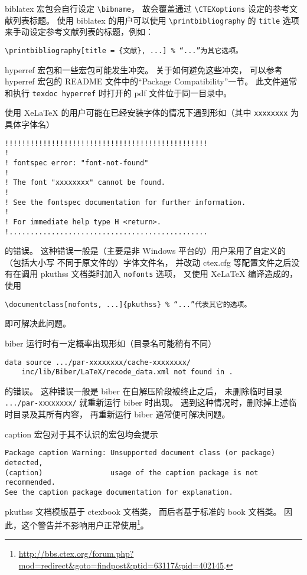 		biblatex 宏包\supercite{biblatex}会自行设定 \verb|\bibname|，
		故会覆盖通过 \verb|\CTEXoptions| 设定的参考文献列表标题。
		使用 biblatex 的用户可以使用 \verb|\printbibliography| 的
		\verb|title| 选项来手动设定参考文献列表的标题，例如：
\begin{Verbatim}[frame = single]
\printbibliography[title = {文献}, ...] % “...”为其它选项。
\end{Verbatim}

		hyperref 宏包\supercite{hyperref}和一些宏包可能发生冲突。
		关于如何避免这些冲突，
		可以参考 hyperref 宏包的 README 文件中的“Package Compatibility”一节。
		此文件通常和执行 \verb|texdoc hyperref| %
		时打开的 pdf 文件位于同一目录中。

		使用 Xe\LaTeX{} 的用户可能在已经安装字体的情况下遇到形如（其中
		\verb|xxxxxxxx| 为具体字体名）
\begin{Verbatim}[frame = single, fontsize = {\small}]
!!!!!!!!!!!!!!!!!!!!!!!!!!!!!!!!!!!!!!!!!!!!!!!!
!
! fontspec error: "font-not-found"
!
! The font "xxxxxxxx" cannot be found.
!
! See the fontspec documentation for further information.
!
! For immediate help type H <return>.
!...............................................
\end{Verbatim}
		的错误。
		这种错误一般是（主要是非 Windows 平台的）用户采用了自定义的（包括大小写
		不同于原文件的）字体文件名，
		并改动 ctex.cfg 等配置文件之后没有在调用 pkuthss 文档类时加入
		\verb|nofonts| 选项，
		又使用 Xe\LaTeX{} 编译造成的，使用
\begin{Verbatim}[frame = single]
\documentclass[nofonts, ...]{pkuthss} % “...”代表其它的选项。
\end{Verbatim}
		即可解决此问题。

		biber 运行时有一定概率出现形如（目录名可能稍有不同）
\begin{Verbatim}[frame = single, fontsize = {\small}]
data source .../par-xxxxxxxx/cache-xxxxxxxx/
	inc/lib/Biber/LaTeX/recode_data.xml not found in .
\end{Verbatim}
		的错误。
		这种错误一般是 biber 在自解压阶段被终止之后，
		未删除临时目录 \verb|.../par-xxxxxxxx/| 就重新运行 biber 时出现。
		遇到这种情况时，删除掉上述临时目录及其所有内容，
		再重新运行 biber 通常便可解决问题。

		caption 宏包\supercite{caption}对于其不认识的宏包均会提示
\begin{Verbatim}[frame = single, fontsize = {\small}]
Package caption Warning: Unsupported document class (or package) detected,
(caption)                usage of the caption package is not recommended.
See the caption package documentation for explanation.
\end{Verbatim}
		pkuthss 文档模版基于 ctexbook 文档类，
		而后者基于标准的 book 文档类。
		因此，这个警告并不影响用户正常使用\footnote{%
			\url{http://bbs.ctex.org/forum.php?mod=redirect&goto=findpost&ptid=63117&pid=402145}.%
		}。

